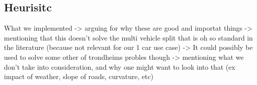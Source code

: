 \subsection{Heurisitc}
What we implemented 
-> arguing for why these are good and importat things 
-> mentioning that this doesn't solve the multi vehicle split that is oh so standard in the literature (because not relevant for our 1 car use case) 
	-> It could possibly be used to solve some other of trondheims probles though 
-> mentioning what we don't take into consideration, and why one might want to look into that (ex impact of weather, slope of roads, curvature, etc)

\cleardoublepage
